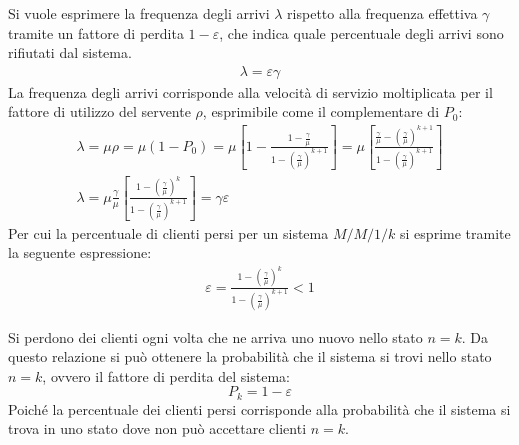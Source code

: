 \documentclass{article}
\numberwithin{equation}{subsection}
\begin{document}
Si vuole esprimere la frequenza degli arrivi $\lambda$ rispetto alla frequenza effettiva $\gamma$ tramite un fattore di perdita $1-\varepsilon$, che indica quale percentuale 
degli arrivi sono rifiutati dal sistema. 
\begin{gather*}
    \lambda=\varepsilon\gamma
\end{gather*}
La frequenza degli arrivi corrisponde alla velocità di servizio moltiplicata per il fattore di utilizzo del servente $\rho$, esprimibile come il complementare di $P_0$:
\begin{gather*}
    \lambda=\mu\rho=\mu(1-P_0)=\mu\left[1-\displaystyle\frac{1-\displaystyle\frac{\gamma}{\mu}}{1-\displaystyle\left(\frac{\gamma}{\mu}\right)^{k+1}}\right]=\mu\left[\displaystyle\frac{\displaystyle\frac{\gamma}{\mu}-\left(\frac{\gamma}{\mu}\right)^{k+1}}{1-\displaystyle\left(\frac{\gamma}{\mu}\right)^{k+1}}\right]\\
    \lambda=\mu\displaystyle\frac{\gamma}{\mu}\left[\displaystyle\frac{\displaystyle1-\left(\frac{\gamma}{\mu}\right)^{k}}{1-\displaystyle\left(\frac{\gamma}{\mu}\right)^{k+1}}\right]=\gamma\varepsilon
\end{gather*}
Per cui la percentuale di clienti persi per un sistema $M/M/1/k$ si esprime tramite la seguente espressione:
\begin{gather}
    \varepsilon=\displaystyle\frac{\displaystyle1-\left(\frac{\gamma}{\mu}\right)^{k}}{1-\displaystyle\left(\frac{\gamma}{\mu}\right)^{k+1}}<1
\end{gather}

Si perdono dei clienti ogni volta che ne arriva uno nuovo nello stato $n=k$. Da questo relazione si può ottenere la probabilità che il sistema si trovi nello stato 
$n=k$, ovvero il fattore di perdita del sistema:
\begin{equation}
    P_k=1-\varepsilon
\end{equation}
Poiché la percentuale dei clienti persi corrisponde alla probabilità che il sistema si trova in uno stato dove non può accettare clienti $n=k$.
\end{document}
